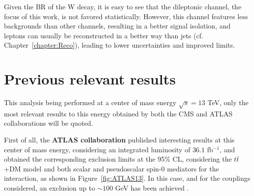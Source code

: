 \documentclass[a4paper, 10pt, openright]{report}
\begin{document}
Given the \ac{BR} of the W decay, it is easy to see that the dileptonic channel, the focus of this work, is not favored statistically. However, this channel features less backgrounds than other channels, resulting in a better signal isolation, and leptons can usually be reconstructed in a better way than jets (cf. Chapter~\ref{chapter:Reco}), leading to lower uncertainties and improved limits.

\section{Previous relevant results} \label{section:PreviousResults}

This analysis being performed at a center of mass energy $\sqrt{s} = 13$ TeV, only the most relevant results to this energy obtained by both the \ac{CMS} and \ac{ATLAS} collaborations will be quoted. 

First of all, the \textbf{\ac{ATLAS} collaboration} published interesting results at this center of mass energy, considering an integrated luminosity of $36.1$ fb$^{-1}$, and obtained the corresponding exclusion limits at the 95\% \ac{CL}, considering the $t \bar t$+DM model and both scalar and pseudoscalar spin-0 mediators for the interaction, as shown in Figure~\ref{fig:ATLAS13}. In this case, and for the couplings considered, an exclusion up to $\sim100$ GeV has been achieved \cite{PreviousDoubleTopBottomAllLep13ATLAS}.
\end{document}
